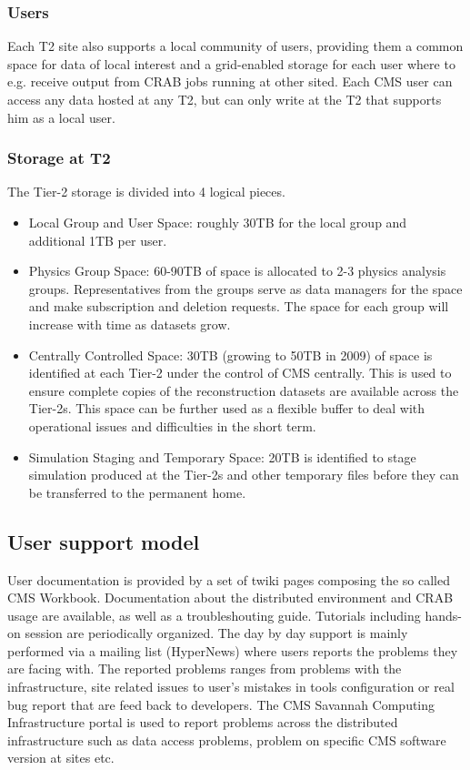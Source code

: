 \subsubsection{Users}
Each T2 site also supports a local community of users, providing them
a common space for data of local interest and a grid-enabled
storage for each user where to e.g. receive output from CRAB jobs
running at other sited. Each CMS user can access any data
hosted at any T2, but can only write at the T2 that supports him
as a local user.

\subsubsection{Storage at T2}
The Tier-2 storage is divided into 4 logical pieces.
\begin{itemize}
\item{} Local Group and User Space: roughly 30TB for the local group and additional
1TB per user.
\item{} Physics Group Space: 60-90TB of space is allocated to 2-3 physics analysis groups.
Representatives from the groups serve as data managers for the space
and make subscription and deletion requests.
The space for each group will increase with time as datasets grow.
\item{} Centrally Controlled Space: 30TB (growing to 50TB in 2009) of space is
identified at each Tier-2 under the control of CMS centrally.
This is used to ensure complete copies of the
reconstruction datasets are available across the Tier-2s. This space can
be further used as a flexible buffer to deal with operational issues and difficulties
in the short term.
\item{} Simulation Staging and Temporary Space: 20TB is identified to
stage simulation produced at the Tier-2s and other temporary
files before they can be transferred to the permanent home. 
\end{itemize}

\subsection{User support model}
\label{sec:4_4}
User documentation is provided by a set of twiki pages composing the so called CMS Workbook. Documentation about the distributed environment and CRAB usage are available, as well as a troubleshouting guide.
Tutorials including hands-on session are periodically organized.
The day by day support is mainly performed via a mailing list (HyperNews) where
users reports the problems they are facing with. The reported problems ranges
 from problems with the infrastructure, site related issues to user's mistakes in tools configuration or real bug report that are feed back to developers.
The CMS Savannah Computing Infrastructure portal is used to report problems across the distributed infrastructure such as data access problems, problem on specific CMS software version at sites etc.

